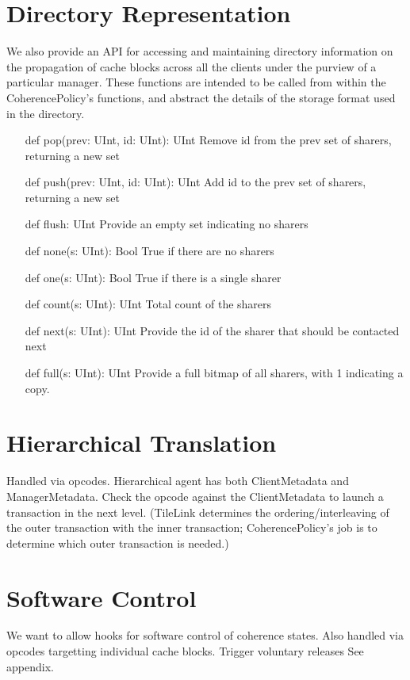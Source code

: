 \section{Directory Representation}

We also provide an API for accessing and maintaining directory information on the propagation of cache blocks across all the clients under the purview of a particular manager. These functions are intended to be called from within the CoherencePolicy’s functions, and abstract the details of the storage format used in the directory.

\begin{itemize}
\item[def pop(prev: UInt, id: UInt): UInt]
Remove id from the prev set of sharers, returning a new set
\item[def push(prev: UInt, id: UInt): UInt]
Add id to the prev set of sharers, returning a new set
\item[def flush: UInt]
Provide an empty set indicating no sharers
\item[def none(s: UInt): Bool]
True if there are no sharers
\item[def one(s: UInt): Bool]
True if there is a single sharer
\item[def count(s: UInt): UInt]
Total count of the sharers
\item[def next(s: UInt): UInt]
Provide the id of the sharer that should be contacted next
\item[def full(s: UInt): UInt]
Provide a full bitmap of all sharers, with 1 indicating a copy.
\end{itemize}

\section{Hierarchical Translation}

Handled via opcodes.
Hierarchical agent has both ClientMetadata and ManagerMetadata. 
Check the opcode against the ClientMetadata to launch a transaction in the next level.
(TileLink determines the ordering/interleaving of the outer transaction with the inner transaction;
CoherencePolicy's job is to determine which outer transaction is needed.)


\section{Software Control}

We want to allow hooks for software control of coherence states.
Also handled via opcodes targetting individual cache blocks.
Trigger voluntary releases
See appendix.

